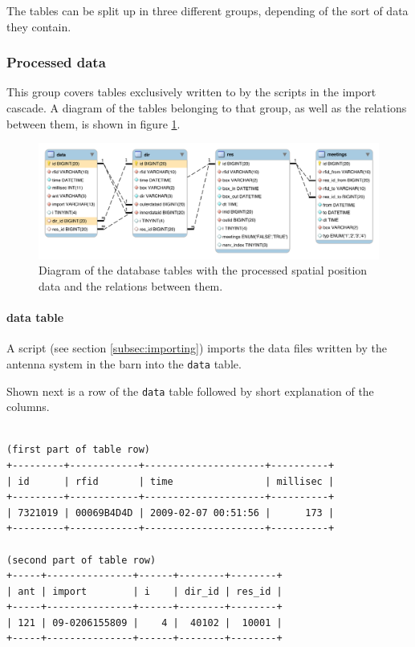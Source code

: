 The tables can be split up in three different groups, depending of the sort of data they contain. 

\subsubsection{Processed data}

This group covers tables exclusively written to by the scripts in the import cascade. A diagram of the tables belonging to that group, as well as the relations between them, is shown in figure \ref{fig:processed_data_schema}. 

\begin{figure}[htpb]
\begin{center}
  \includegraphics[width=\textwidth]{assets/pdf/processed_data_schema.pdf}
  \caption[Diagram of database tables with processed data]{Diagram of the database tables with the processed spatial position data and the relations between them.}
  \label{fig:processed_data_schema}
\end{center}
\end{figure} 

\paragraph{data table}
\label{para:data_table}

A script (see section \ref{subsec:importing}) imports the data files written by the antenna system in the barn into the \lstinline|data| table.

Shown next is a row of the \lstinline|data| table followed by short explanation of the columns.

\codescript
{}
\begin{lstlisting}[frame=none]

(first part of table row)
+---------+------------+---------------------+----------+
| id      | rfid       | time                | millisec |
+---------+------------+---------------------+----------+
| 7321019 | 00069B4D4D | 2009-02-07 00:51:56 |      173 |
+---------+------------+---------------------+----------+

(second part of table row)
+-----+---------------+------+--------+--------+
| ant | import        | i    | dir_id | res_id |
+-----+---------------+------+--------+--------+
| 121 | 09-0206155809 |    4 |  40102 |  10001 |
+-----+---------------+------+--------+--------+

\end{lstlisting}

